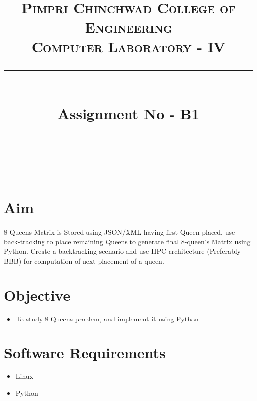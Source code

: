 \documentclass[a4paper,12pt]{article}
\title{
	\normalfont \normalsize 
	\textsc{Pimpri Chinchwad College of Engineering \\ 
		Computer Laboratory - IV} \\
	[10pt] 
	\rule{\linewidth}{0.5pt} \\[6pt] 
	\huge Assignment No - B1 \\
	\rule{\linewidth}{2pt}  \\[10pt]
}
\author{}
\date{\normalsize}
\newenvironment{codefont}{\fontfamily{ccr}\selectfont}{\par}
\begin{document}
\maketitle

\section{Aim}
	\paragraph{} 8-Queens Matrix is Stored using JSON/XML having first Queen placed, use back-tracking to place
	remaining Queens to generate final 8-queen’s Matrix using Python. Create a backtracking scenario and
	use HPC architecture (Preferably BBB) for computation of next placement of a queen.
	
\section{Objective}
	\begin{itemize}
		\item To study 8 Queens problem, and implement it using Python 
	\end{itemize}
	
\section{Software Requirements}
	\begin{itemize}
		\item	Linux
		\item   Python
	\end{itemize}
	
\end{document}
